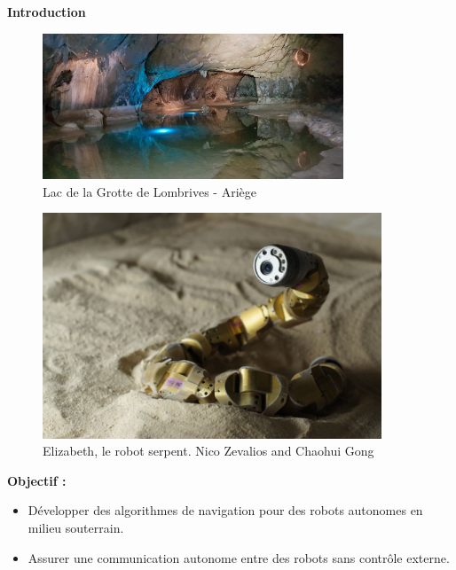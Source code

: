 \documentclass[aspectratio=169,10pt]{beamer}
\begin{document}
\begin{frame}{\textbf{Introduction}}

	\begin{minipage}{0.6\linewidth}
		\begin{figure}
			\centering
			\includegraphics[width=0.8\textwidth]{IMAGES/le-lac-des-grottes-lombrives.jpg}
			\caption{Lac de la Grotte de Lombrives - Ariège}
			\label{fig:ariege_cave}
		\end{figure}
	\end{minipage}
	\hfill
	\begin{minipage}{0.35\linewidth}
		\begin{figure}
			\centering
			\includegraphics[width=0.9\textwidth]{IMAGES/Elizabeth.png}
			\caption{Elizabeth, le robot serpent. Nico Zevalios and Chaohui Gong}
			\label{fig:robot_exploration}
		\end{figure}
	\end{minipage}
    
	\textbf{Objectif :}

	\vspace{0.8em}
	\begin{itemize}
		\item Développer des algorithmes de navigation pour des robots autonomes en milieu souterrain.
		\vspace{0.2cm}
		\item Assurer une communication autonome entre des robots sans contrôle externe.
	\end{itemize}
\end{frame}
\end{document}

